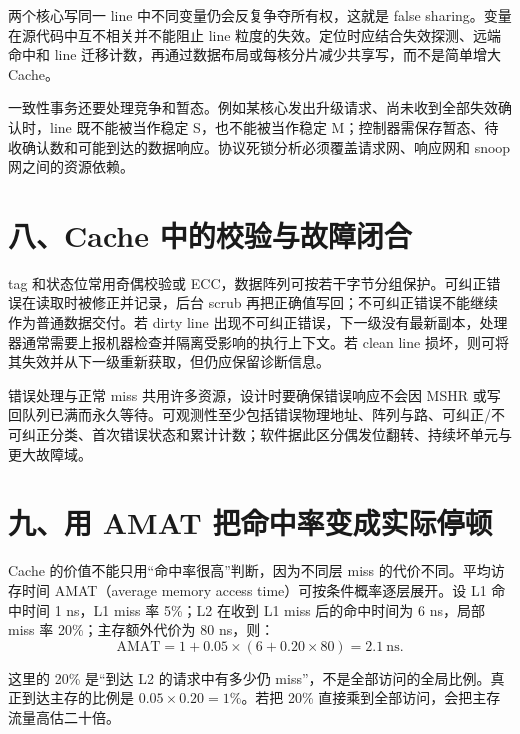 两个核心写同一 line 中不同变量仍会反复争夺所有权，这就是 false sharing。变量在源代码中互不相关并不能阻止 line 粒度的失效。定位时应结合失效探测、远端命中和 line 迁移计数，再通过数据布局或每核分片减少共享写，而不是简单增大 Cache。

一致性事务还要处理竞争和暂态。例如某核心发出升级请求、尚未收到全部失效确认时，line 既不能被当作稳定 S，也不能被当作稳定 M；控制器需保存暂态、待收确认数和可能到达的数据响应。协议死锁分析必须覆盖请求网、响应网和 snoop 网之间的资源依赖。

\section{八、Cache 中的校验与故障闭合}

tag 和状态位常用奇偶校验或 ECC，数据阵列可按若干字节分组保护。可纠正错误在读取时被修正并记录，后台 scrub 再把正确值写回；不可纠正错误不能继续作为普通数据交付。若 dirty line 出现不可纠正错误，下一级没有最新副本，处理器通常需要上报机器检查并隔离受影响的执行上下文。若 clean line 损坏，则可将其失效并从下一级重新获取，但仍应保留诊断信息。

错误处理与正常 miss 共用许多资源，设计时要确保错误响应不会因 MSHR 或写回队列已满而永久等待。可观测性至少包括错误物理地址、阵列与路、可纠正/不可纠正分类、首次错误状态和累计计数；软件据此区分偶发位翻转、持续坏单元与更大故障域。




























\section{九、用 AMAT 把命中率变成实际停顿}

Cache 的价值不能只用“命中率很高”判断，因为不同层 miss 的代价不同。平均访存时间 AMAT（average memory access time）可按条件概率逐层展开。设 L1 命中时间 1 ns，L1 miss 率 5\%；L2 在收到 L1 miss 后的命中时间为 6 ns，局部 miss 率 20\%；主存额外代价为 80 ns，则：
\[
\mathrm{AMAT}=1+0.05\times(6+0.20\times80)=2.1\ \mathrm{ns}.
\]

这里的 20\% 是“到达 L2 的请求中有多少仍 miss”，不是全部访问的全局比例。真正到达主存的比例是 $0.05\times0.20=1\%$。若把 20\% 直接乘到全部访问，会把主存流量高估二十倍。

